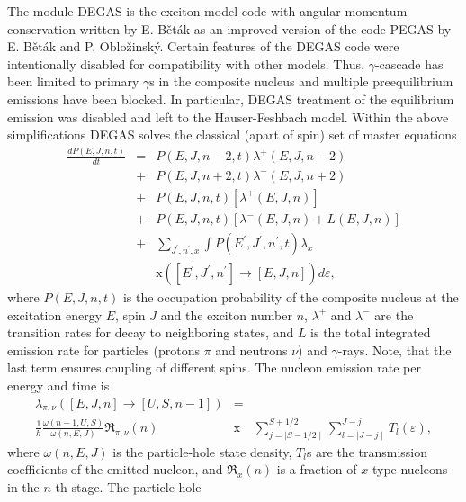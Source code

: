 \documentclass[twocolumn,amsmath,amssymb,10pt,groupedaddress,letter]{revtex4}
\begin{document}
The module DEGAS is the exciton model
code with angular-momentum conservation written by E. B\v et\' ak
as an improved version of the code PEGAS \cite{Degas} by E. B\v et\' ak
and P. Oblo\v zinsk\' y.  Certain features of the DEGAS code
were intentionally disabled for compatibility with other models.
Thus, $\gamma$-cascade has been limited to primary
$\gamma$s in the composite nucleus and multiple preequilibrium emissions
have been blocked. In particular, DEGAS treatment of the equilibrium
emission was disabled and left to the Hauser-Feshbach
model.
Within the above simplifications DEGAS solves the classical
(apart of spin) set of master equations
\begin{eqnarray}
\frac{dP(E,J,n,t)}{dt} & = & P(E,J,n-2,t)\lambda^{+}(E,J,n-2)\nonumber \\
 & + & P(E,J,n+2,t)\lambda^{-}(E,J,n+2)\nonumber \\
 & + & P(E,J,n,t)\left[\lambda^{+}(E,J,n)\right]\nonumber\\
 & + & P(E,J,n,t)\left[\lambda^{-}(E,J,n)+L(E,J,n)\right]\label{mastereq}\nonumber\\
 & + & \sum_{J^{'},n^{'},x}\int P(E^{'},J^{'},n^{'},t)\lambda_{x}\nonumber\\
 &&\text{x} \left(\left[E^{'},J^{'},n^{'}\right]\rightarrow\left[E,J,n\right]\right)d\varepsilon,
\end{eqnarray}
\noindent where $P(E,J,n,t)$ is the occupation probability of the composite
nucleus at the excitation energy $E$, spin $J$ and the exciton number
$n$, $\lambda^{+}$ and $\lambda^{-}$ are the transition rates for
decay to neighboring states, and $L$ is the total integrated emission
rate for particles (protons $\pi$ and neutrons $\nu$) and $\gamma$-rays.
Note, that the last term ensures coupling of different spins. The
nucleon emission rate per energy and time is
\begin{eqnarray}
\lambda_{\pi,\nu}\left(\left[E,J,n\right]\rightarrow\left[U,S,n-1\right]\right)&=&\\
\frac{1}{h}\frac{\omega(n-1,U,S)}{\omega(n,E,J)}\Re_{\pi,\nu}(n)&\text{x}& \sum_{j=\mid S-1/2\mid}^{S+1/2}\sum_{l=\mid J-j\mid}^{J-j}T_{l}(\varepsilon),\nonumber
\end{eqnarray}
\noindent where $\omega(n,E,J)$ is the particle-hole state density, $T_{l}$s
are the transmission coefficients of the emitted nucleon, and $\Re_{x}(n)$
is a fraction of $x$-type nucleons in the $n$-th stage. The particle-hole
\end{document}
